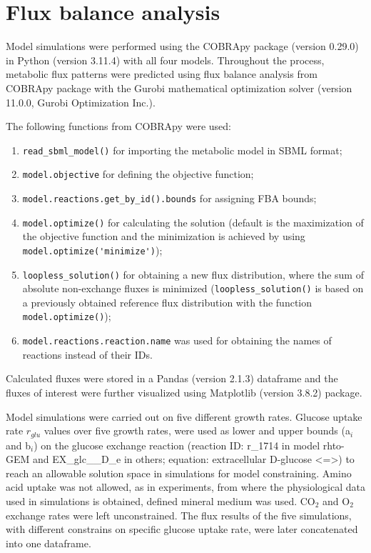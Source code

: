 \section{Flux balance analysis} 

Model simulations were performed using the COBRApy
package (version 0.29.0) \cite{Ebrahim2013} in Python (version 3.11.4) with all four models. 
Throughout the process, metabolic flux patterns were predicted using flux balance analysis \cite{Orth2010} from COBRApy package with the Gurobi mathematical optimization solver (version 11.0.0, Gurobi Optimization Inc.). 

The following functions from COBRApy were used:
\vspace{-0.4cm} %
\begin{enumerate}[noitemsep, label=(\roman*)]
    \item \verb|read_sbml_model()| for importing the metabolic model in SBML format; 
    \item \verb|model.objective| for defining the objective function; 
    \item \verb|model.reactions.get_by_id().bounds| for assigning FBA bounds; 
    \item \verb|model.optimize()| for calculating the solution (default is the maximization of the objective function and the minimization is achieved by using \verb|model.optimize('minimize')|); 
    \item \verb|loopless_solution()| for obtaining a new flux distribution, where the sum of absolute non-exchange fluxes is minimized (\verb|loopless_solution()| is based on a previously obtained reference flux distribution with the function \verb|model.optimize()|); 
    \item \verb|model.reactions.reaction.name| was used for obtaining the names of reactions instead of their IDs.
\end{enumerate}
\vspace{-0.4cm} %
Calculated fluxes were stored in a Pandas (version 2.1.3) dataframe and the fluxes of interest were further visualized using Matplotlib (version 3.8.2) package.
 
Model simulations were carried out on five different growth rates.
Glucose uptake rate $r_{glu}$ values
over five growth rates, were used as lower and upper bounds (a$_i$ and b$_i$) on the glucose exchange reaction (reaction ID: r\_1714 in model rhto-GEM and EX\_glc\_\_D\_e in others; equation: extracellular D-glucose <=>) to reach an allowable solution space
in simulations for model constraining. Amino acid uptake was not allowed, as in experiments, from where the physiological data used in simulations is obtained, defined mineral medium was used. CO$_2$ and O$_2$ exchange rates were left unconstrained. The flux results of the five simulations, with different constrains on specific glucose uptake rate, were later concatenated into one dataframe.

